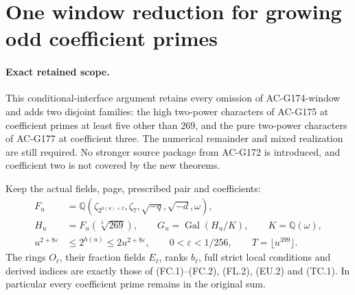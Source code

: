 \section{One window reduction for growing odd coefficient primes}
\label{sec:odd-prime-uniform-actual-window}

\paragraph{Exact retained scope.}
This conditional-interface argument retains every omission of
AC-G174-window and adds two disjoint families: the high two-power
characters of AC-G175 at coefficient primes at least five other
than $269$, and the pure two-power characters of AC-G177 at
coefficient three.  The numerical remainder and mixed realization
are still required.  No stronger source package from AC-G172 is
introduced, and coefficient two is not covered by the new theorems.

Keep the actual fields, page, prescribed pair and coefficients:
\[
 \begin{aligned}
 F_u&=\mathbb Q(\zeta_{2^{h(u)+2}},\zeta_7,
                                  \sqrt{-q},\sqrt{-d},\omega),\\
 H_u&=F_u(\sqrt[3]{269}),\qquad
 G_u=\operatorname{Gal}(H_u/K),\qquad K=\mathbb Q(\omega),\\
 u^{2+8\varepsilon}&\leq2^{h(u)}\leq2u^{2+8\varepsilon},
 \qquad 0<\varepsilon<1/256,\qquad T=\lfloor u^{399}\rfloor.
 \end{aligned}
 \tag{OPW.1}
\]
The rings $O_\ell$, their fraction fields $E_\ell$, ranks $b_\ell$,
full strict local conditions and derived indices are exactly those
of (FC.1)--(FC.2), (FL.2), (EU.2) and (TC.1).
In particular every coefficient prime remains in the original sum.

